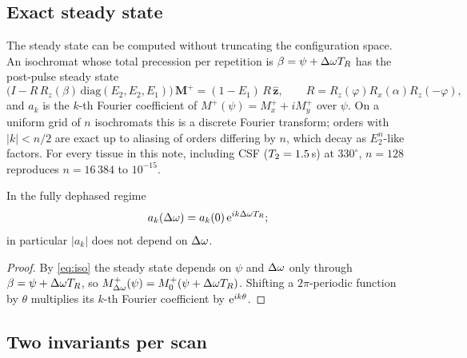 \subsection{Exact steady state}

The steady state can be computed without truncating the configuration space. An isochromat
whose total precession per repetition is $\beta=\psi+\Delta\omega T_R$ has the post-pulse steady state
\begin{equation}
  \bigl(I-R\,R_z(\beta)\,\mathrm{diag}(E_2,E_2,E_1)\bigr)\,\mathbf M^+=(1-E_1)\,R\,\hat{\mathbf z},
  \qquad R=R_z(\varphi)R_x(\alpha)R_z(-\varphi),
  \label{eq:iso}
\end{equation}
and $a_k$ is the $k$-th Fourier coefficient of $M^+(\psi)=M_x^++iM_y^+$ over $\psi$. On a uniform
grid of $n$ isochromats this is a discrete Fourier transform; orders with $|k|<n/2$ are exact
up to aliasing of orders differing by $n$, which decay as $E_2^{n}$-like factors. For every
tissue in this note, including CSF ($T_2=1.5$\,s) at $330^\circ$, $n=128$ reproduces
$n=16\,384$ to $10^{-15}$.

\begin{proposition}\label{prop:offres}
In the fully dephased regime
\[
  a_k(\Delta\omega)=a_k(0)\,\mathrm{e}^{ik\Delta\omega T_R};
\]
in particular $|a_k|$ does not depend on $\Delta\omega$.
\end{proposition}
\begin{proof}
By \eqref{eq:iso} the steady state depends on $\psi$ and $\Delta\omega$ only through $\beta=\psi+\Delta\omega T_R$,
so $M^+_{\Delta\omega}(\psi)=M^+_0(\psi+\Delta\omega T_R)$. Shifting a $2\pi$-periodic function by $\theta$ multiplies
its $k$-th Fourier coefficient by $\mathrm{e}^{ik\theta}$.
\end{proof}

\subsection{Two invariants per scan}

